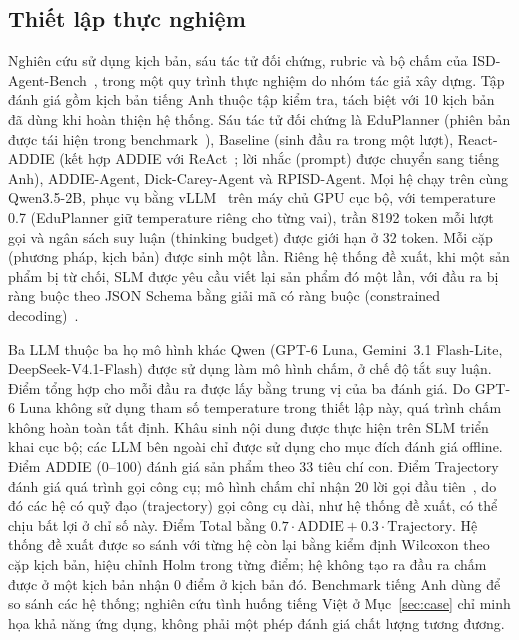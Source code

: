\documentclass[conference,a4paper]{IEEEtran}
\begin{document}
\subsection{Thiết lập thực nghiệm}
\label{sec:setup}

Nghiên cứu sử dụng kịch bản, sáu tác tử đối chứng, rubric và bộ chấm của
ISD-Agent-Bench~\cite{isdagentbench}, trong một quy trình thực nghiệm do nhóm tác giả xây dựng. Tập đánh giá gồm
\NScen{} kịch bản tiếng Anh thuộc tập kiểm tra, tách biệt với 10 kịch bản đã dùng khi hoàn thiện
hệ thống. Sáu tác tử đối chứng là EduPlanner (phiên bản được tái hiện trong
benchmark~\cite{zhang2025eduplanner}), Baseline (sinh đầu ra trong một lượt), React-ADDIE (kết hợp ADDIE với
ReAct~\cite{yao2023react}; lời nhắc (prompt) được chuyển sang tiếng Anh), ADDIE-Agent, Dick-Carey-Agent và
RPISD-Agent. Mọi hệ chạy trên cùng Qwen3.5-2B, phục vụ bằng vLLM~\cite{kwon2023vllm} trên máy chủ
GPU cục bộ, với temperature 0.7 (EduPlanner giữ temperature riêng cho từng vai), trần 8192 token
mỗi lượt gọi và ngân sách suy luận (thinking budget) được giới hạn ở 32 token. Mỗi cặp
(phương pháp, kịch bản) được sinh một lần. Riêng hệ thống đề xuất, khi một sản phẩm bị từ chối, SLM được yêu cầu
viết lại sản phẩm đó một lần, với đầu ra bị ràng buộc theo JSON Schema bằng giải mã có ràng buộc (constrained decoding)~\cite{vllmstructured}.

Ba LLM thuộc ba họ mô hình khác Qwen (GPT-6 Luna, Gemini~3.1 Flash-Lite, DeepSeek-V4.1-Flash)
được sử dụng làm mô hình chấm, ở chế độ tắt suy luận. Điểm tổng hợp cho mỗi đầu ra được lấy bằng
trung vị của ba đánh giá. Do GPT-6 Luna không sử dụng tham số temperature trong thiết lập này,
quá trình chấm không hoàn toàn tất định. Khâu sinh nội dung được thực hiện trên SLM triển
khai cục bộ; các LLM bên ngoài chỉ được sử dụng cho mục đích đánh giá offline. Điểm ADDIE (0--100) đánh giá sản
phẩm theo 33 tiêu chí con. Điểm Trajectory đánh giá quá trình gọi công cụ; mô hình chấm chỉ nhận 20
lời gọi đầu tiên~\cite{isdagentbench}, do đó các hệ có quỹ đạo (trajectory) gọi công cụ dài, như hệ thống đề
xuất, có thể chịu bất lợi ở chỉ số này.
Điểm Total bằng $0.7\cdot\mathrm{ADDIE}+0.3\cdot\mathrm{Trajectory}$. Hệ thống đề xuất được so
sánh với từng hệ còn lại bằng kiểm định Wilcoxon theo cặp kịch bản, hiệu chỉnh Holm trong từng
điểm; hệ không tạo ra đầu ra chấm được ở một kịch bản nhận 0 điểm ở kịch bản đó. Benchmark tiếng Anh
dùng để so sánh các hệ thống; nghiên cứu tình huống tiếng Việt ở Mục~\ref{sec:case} chỉ minh họa
khả năng ứng dụng, không phải một phép đánh giá chất lượng tương đương.
\end{document}
